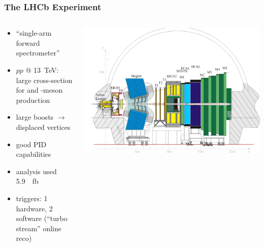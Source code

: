 \documentclass[18pt, aspectratio=169]{beamer}
\begin{document}
\begin{frame}
  \frametitle{The LHCb Experiment}
  \begin{columns}
    \begin{column}{0.45\textwidth}
      \begin{itemize}
      \item ``single-arm forward spectrometer''
      \item $pp$ @ \SI{13}{\TeV}: large cross-section for \PB and \PD-meson production
      \item large boosts $\rightarrow$ displaced vertices
      \item good PID capabilities
      \item analysis used \SI{5.9}{\per\femto\barn}
      \item triggers: 1 hardware, 2 software (``turbo stream'' online reco)
      \end{itemize}
    \end{column}
    \begin{column}{0.55\textwidth}
      \includegraphics[width=\textwidth]{figures/Lhcbview.jpg}
    \end{column}
  \end{columns}

\end{frame}
\end{document}
